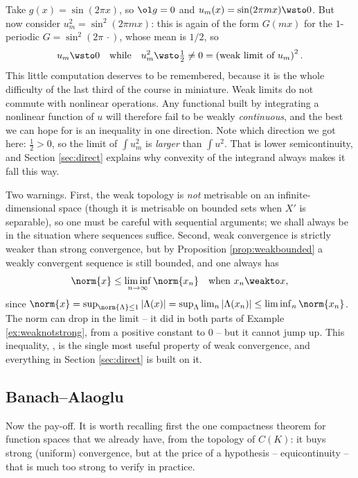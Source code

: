 \begin{example}\label{ex:squarestrick}
	Take $g(x)=\sin(2\pi x)$, so $\ol g = 0$ and $u_m(x) = \sin(2\pi mx)\wsto 0$. But now consider $u_m^2 = \sin^2(2\pi m x)$: this is again of the form $G(mx)$ for the $1$-periodic $G = \sin^2(2\pi\, \cdot)$, whose mean is $1/2$, so
	$$u_m \wsto 0 \quad \text{while} \quad u_m^2 \wsto \tfrac12 \ne 0 = \left( \text{weak limit of } u_m\right)^2.$$
	This little computation deserves to be remembered, because it is the whole difficulty of the last third of the course in miniature. Weak limits do not commute with nonlinear operations. Any functional built by integrating a nonlinear function of $u$ will therefore fail to be weakly \emph{continuous}, and the best we can hope for is an inequality in one direction. Note which direction we got here: $\frac 12 > 0$, so the limit of $\int u_m^2$ is \emph{larger} than $\int u^2$. That is lower semicontinuity, and Section \ref{sec:direct} explains why convexity of the integrand always makes it fall this way.
\end{example}

\begin{remark}
	Two warnings. First, the weak topology is \emph{not} metrisable on an infinite-dimensional space (though it is metrisable on bounded sets when $X'$ is separable), so one must be careful with sequential arguments; we shall always be in the situation where sequences suffice. Second, weak convergence is strictly weaker than strong convergence, but by Proposition \ref{prop:weakbounded} a weakly convergent sequence is still bounded, and one always has
	$$\norm{x} \le \liminf_{n\to\infty}\norm{x_n} \quad \text{when } x_n \weakto x,$$
	since $\norm{x} = \sup_{\norm{\Lambda}\le 1}|\Lambda(x)| = \sup_\Lambda \lim_n |\Lambda(x_n)| \le \liminf_n \norm{x_n}$. The norm can drop in the limit -- it did in both parts of Example \ref{ex:weaknotstrong}, from a positive constant to $0$ -- but it cannot jump up. This inequality, , is the single most useful property of weak convergence, and everything in Section \ref{sec:direct} is built on it.
\end{remark}

\subsection{Banach--Alaoglu}

Now the pay-off. It is worth recalling first the one compactness theorem for function spaces that we already have, from the topology of $C(K)$: it buys strong (uniform) convergence, but at the price of a hypothesis -- equicontinuity -- that is much too strong to verify in practice.

